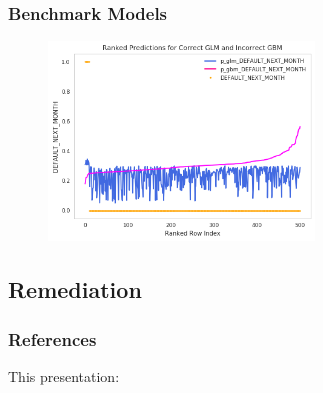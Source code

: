 \documentclass[11pt,
               aspectratio=43,
               hyperref={colorlinks}
               ]{beamer}
\begin{document}
			\begin{frame}
		
				\frametitle{\textbf{Benchmark Models}}
		
				\begin{figure}[htb]
					\begin{center}
						\includegraphics[height=150pt]{img/benchmark.png}
					\end{center}
				\end{figure}	
		
			\end{frame}

		\subsection{Remediation}


	\begin{frame}[t, allowframebreaks]
	
		\frametitle{References}	
		
			This presentation:\\
					
		\framebreak		
		
		\printbibliography
		
	\end{frame}
\end{document}
